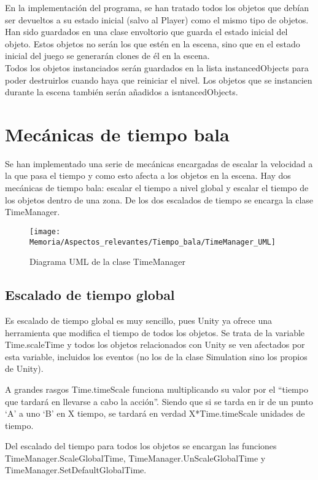 En la implementación del programa, se han tratado todos los objetos que debían ser devueltos a su estado inicial (salvo al Player) como el mismo tipo de objetos. Han sido guardados en una clase envoltorio que guarda el estado inicial del objeto. Estos objetos no serán los que estén en la escena, sino que en el estado inicial del juego se generarán clones de él en la escena.\\
Todos los objetos instanciados serán guardados en la lista instancedObjects para poder destruirlos cuando haya que reiniciar el nivel. Los objetos que se instancien durante la escena también serán añadidos a isntancedObjects.

\section{Mecánicas de tiempo bala}
Se han implementado una serie de mecánicas encargadas de escalar la velocidad a la que pasa el tiempo y como esto afecta a los objetos en la escena. Hay dos mecánicas de tiempo bala: escalar el tiempo a nivel global y escalar el tiempo de los objetos dentro de una zona. De los dos escalados de tiempo se encarga la clase TimeManager.

\clearpage
\begin{figure}[h]
\texttt{[image: Memoria/Aspectos\_relevantes/Tiempo\_bala/TimeManager\_UML]}
\caption{Diagrama UML de la clase TimeManager}
\end{figure}

\subsection{Escalado de tiempo global}
Es escalado de tiempo global es muy sencillo, pues Unity ya ofrece una herramienta que modifica el tiempo de todos los objetos. Se trata de la variable Time.scaleTime y todos los objetos relacionados con Unity se ven afectados por esta variable, incluidos los eventos (no los de la clase Simulation sino los propios de Unity).

A grandes rasgos Time.timeScale funciona multiplicando su valor por el “tiempo que tardará en llevarse a cabo la acción”. Siendo que si se tarda en ir de un punto ‘A’ a uno ‘B’ en X tiempo, se tardará en verdad X*Time.timeScale unidades de tiempo.

Del escalado del tiempo para todos los objetos se encargan las funciones TimeManager.ScaleGlobalTime, TimeManager.UnScaleGlobalTime y TimeManager.SetDefaultGlobalTime.

